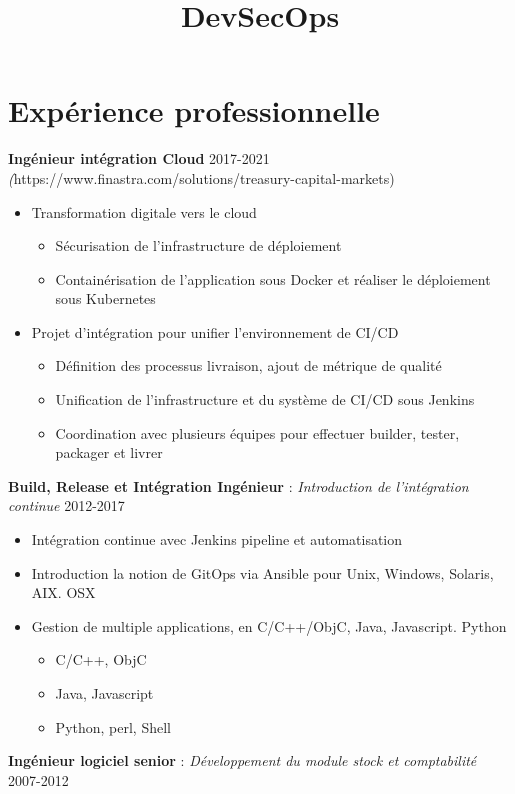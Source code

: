 \documentclass[11pt,a4paper]{moderncv}
\title{DevSecOps}
\begin{document}
\makecvtitle

\section{Expérience professionnelle}


{
\bigskip
\textbf{Ingénieur intégration Cloud} \hfill 2017-2021
\textit(https://www.finastra.com/solutions/treasury-capital-markets)
\bigskip
	\begin{itemize}%
		\item Transformation digitale vers le cloud
			\begin{itemize}%
				\item Sécurisation de l'infrastructure de déploiement
				\item Containérisation de l'application sous Docker et réaliser le déploiement sous Kubernetes
			\end{itemize}
	\end{itemize}
\bigskip
	\begin{itemize}%
	\item	Projet d’intégration pour unifier l'environnement de CI/CD
		\begin{itemize}%
				\item Définition des processus livraison, ajout de métrique de qualité
				\item Unification de l'infrastructure et du système de CI/CD sous Jenkins
				\item Coordination avec plusieurs équipes pour effectuer builder, tester, packager  et livrer
		\end{itemize}
	\end{itemize}
\bigskip
 \textbf{Build, Release et Intégration Ingénieur} : \textit{Introduction de l'intégration continue} \hfill 2012-2017
\bigskip
			\begin{itemize}%
				\item Intégration continue avec Jenkins pipeline et automatisation
                \item Introduction la notion de GitOps via Ansible pour Unix, Windows, Solaris, AIX. OSX
				\item Gestion de multiple applications, en C/C++/ObjC, Java, Javascript. Python
					\begin{itemize}
						\item C/C++, ObjC
						\item Java, Javascript
						\item Python, perl, Shell
					\end{itemize}
				\end{itemize}
\bigskip
\textbf{Ingénieur logiciel senior} : \textit{Développement du module stock et comptabilité} \hfill 2007-2012

}
\end{document}
